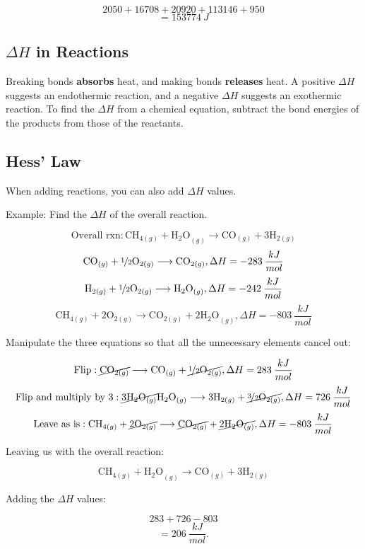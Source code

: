 \documentclass[a4paper, 12pt]{article}
\begin{document}
\[2050 + 16708 + 20920 + 113146 + 950\]
\[=\boxed{153774 \: J}\]

\subsection*{$\Delta H$ in Reactions}
Breaking bonds \textbf{absorbs} heat, and making bonds \textbf{releases} heat. A positive $\Delta H$ suggests an endothermic reaction, and a negative $\Delta H$ suggests an exothermic reaction. To find the $\Delta H$ from a chemical equation, subtract the bond energies of the products from those of the reactants.

\subsection*{Hess' Law}
When adding reactions, you can also add $\Delta H$ values.

Example: Find the $\Delta H$ of the overall reaction.

$$\text{Overall rxn}: \text{CH}_{4(g)} + \text{H$_2$O}_{(g)} \longrightarrow \text{CO}_{(g)} + \text{3H}_{2(g)}$$
$$\text{CO}_{(g)} + \nicefrac12 \text{O}_{2(g)} \longrightarrow \text{CO}_{2(g)}, \Delta H = -283 \: \frac{kJ}{mol}$$
$$\text{H}_{2(g)} + \nicefrac12 \text{O}_{2(g)} \longrightarrow \text{H$_2$O}_{(g)}, \Delta H = -242 \: \frac{kJ}{mol}$$
$$\text{CH}_{4(g)} + \text{2O}_{2(g)} \longrightarrow \text{CO}_{2(g)} + \text{2H$_2$O}_{(g)}, \Delta H = -803 \: \frac{kJ}{mol}$$

Manipulate the three equations so that all the unnecessary elements cancel out:

$$\text{Flip}: \cancel{\text{CO}_{2(g)}} \longrightarrow \text{CO}_{(g)} + \cancel{\nicefrac12 \text{O}_{2(g)}}, \Delta H = 283 \: \frac{kJ}{mol}$$
$$\text{Flip and multiply by 3}: \cancel{\text{3H$_2$O}_{(g)}} \text{H$_2$O}_{(g)} \longrightarrow \text{3H}_{2(g)} + \cancel{\nicefrac32 \text{O}_{2(g)}}, \Delta H = 726 \: \frac{kJ}{mol}$$
$$\text{Leave as is}: \text{CH}_{4(g)} + \cancel{\text{2O}_{2(g)}} \longrightarrow \cancel{\text{CO}_{2(g)}} + \cancel{\text{2H$_2$O}_{(g)}}, \Delta H = -803 \: \frac{kJ}{mol}$$

Leaving us with the overall reaction:

$$\text{CH}_{4(g)} + \text{H$_2$O}_{(g)} \longrightarrow \text{CO}_{(g)} + \text{3H}_{2(g)}$$

Adding the $\Delta H$ values:

$$283 + 726 - 803$$
$$ = \boxed{206 \: \frac{kJ}{mol}.}$$
\end{document}
